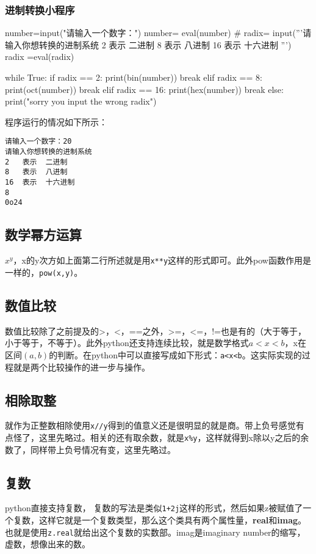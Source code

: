 \documentclass[12pt,oneside]{book}
\begin{document}
\begin{common-format}
\subsubsection{进制转换小程序}

\begin{tcbpython}[]
number=input("请输入一个数字：")
number= eval(number)
#
radix= input('''请输入你想转换的进制系统
2   表示  二进制
8   表示  八进制
16  表示  十六进制
''')
radix =eval(radix)

while True:
    if radix == 2:
        print(bin(number))
        break
    elif radix == 8:
        print(oct(number))
        break
    elif radix == 16:
        print(hex(number))
        break
    else:
        print("sorry you input the wrong radix")
\end{tcbpython}
程序运行的情况如下所示：
\begin{Verbatim}
请输入一个数字：20
请输入你想转换的进制系统
2   表示  二进制
8   表示  八进制
16  表示  十六进制
8
0o24
\end{Verbatim}





\subsection{数学幂方运算}
$ x^y $，x的y次方如上面第二行所述就是用\verb+x**y+这样的形式即可。此外pow函数作用是一样的，\verb+pow(x,y)+。


\subsection{数值比较}
数值比较除了之前提及的>，<，==之外，>=，<=，!=也是有的（大于等于，小于等于，不等于）。此外python还支持连续比较，就是数学格式$a<x<b$，x在区间$(a,b)$的判断。在python中可以直接写成如下形式：\verb+a<x<b+。这实际实现的过程就是两个比较操作的进一步与操作。

\subsection{相除取整}
就作为正整数相除使用\verb+x//y+得到的值意义还是很明显的就是商。带上负号感觉有点怪了，这里先略过。相关的还有取余数，就是\verb+x%y+，这样就得到x除以y之后的余数了，同样带上负号情况有变，这里先略过。



\subsection{复数}
python直接支持复数， 复数的写法是类似\verb|1+2j|这样的形式，然后如果z被赋值了一个复数，这样它就是一个复数类型，那么这个类具有两个属性量，\textbf{real}和\textbf{imag}。也就是使用\verb+z.real+就给出这个复数的实数部。imag是imaginary number的缩写，虚数，想像出来的数。


\end{common-format}
\end{document}

